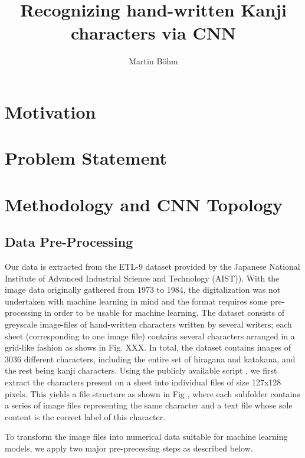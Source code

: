 \documentclass[british,12p]{article}
\title{Recognizing hand-written Kanji characters via CNN}
\author{
        Martin Böhm
        }
\begin{document}
	\maketitle
    \begin{abstract}

           

    \end{abstract}
        
    \section{Motivation}
    
    \section{Problem Statement}
    \section{Methodology and CNN Topology}
    \subsection{Data Pre-Processing}\label{secPreProcess}
    Our data is extracted from the ETL-9 dataset provided by the Japanese National Institute of Advanced Industrial Science and Technology (AIST)). With the image data originally gathered from 1973 to 1984, the digitalization was not undertaken with machine learning in mind and the format requires some pre-processing in order to be usable for machine learning. The dataset consists of greyscale image-files of hand-written characters written by several writers; each sheet (corresponding to one image file) contains several characters arranged in a grid-like fashion as shows in Fig. XXX. In total, the dataset contains  images of 3036 different characters, including the entire set of hiragana and katakana, and the rest being kanji characters. 
    	Using the publicly available script , we first extract the characters present on a sheet into individual files of size 127x128 pixels. This yields a file structure as shown in Fig , where each subfolder contains a series of image files representing the same character and a text file whose sole content is the correct label of this character.
    	
    	To transform the image files into numerical data suitable for machine learning models, we apply two major pre-precessing steps as described below.\\
    	
\end{document}
